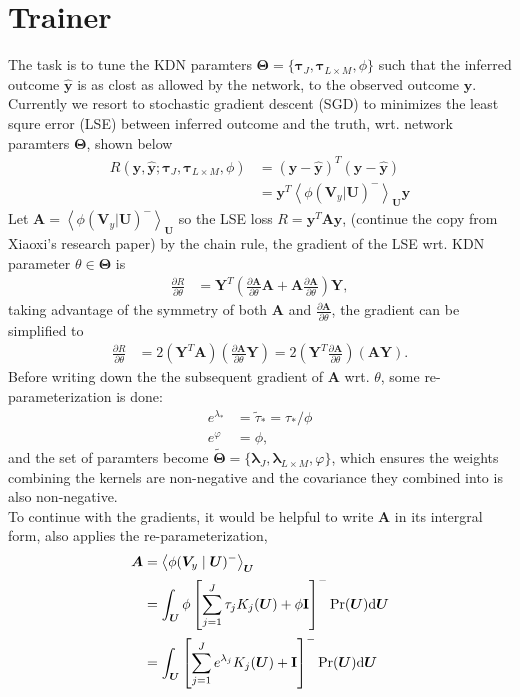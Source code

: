 \documentclass[11pt]{article}
\newcommand{\bs}{\boldsymbol}
\newcommand{\mean}[2]{\left\langle{#1}\right\rangle_{#2}}
\newcommand{\vy}{\boldsymbol{y}}
\newcommand{\xv}{\boldsymbol{V}}
\newcommand{\xu}{\boldsymbol{U}}
\newcommand{\xy}{\boldsymbol{Y}}
\newcommand{\xa}{\boldsymbol{A}}
\newcommand{\vyh}{\hat{\vy}}
\newcommand{\id}{\textrm{\textbf{I}}}
\newcommand{\PDV}[2]{\frac{\partial #1}{\partial #2}}
\begin{document}
\section{Trainer}
The task is to tune the KDN paramters $\bs{\Theta} = \{\bs{\tau}_J, \bs{\tau}_{L \times M}, \phi\}$ such that the inferred outcome $\vyh$ is as clost as allowed by the network, to the observed outcome $\vy$. Currently we resort to stochastic gradient descent (SGD) to minimizes the least squre error (LSE) between inferred outcome and the truth, wrt. network paramters $\bs{\Theta}$, shown below
\begin{equation}
  \begin{split}
    R(\vy, \vyh ; \bs{\tau}_J, \bs{\tau}_{L \times M}, \phi) &= (\vy - \vyh)^T(\vy - \vyh) \\
    &= \vy^T \mean{\phi (\xv_y|\xu)^-}{\xu} \vy
  \end{split}
\end{equation}
Let $\xa = \mean{\phi (\xv_y|\xu)^-}{\xu}$ so the LSE loss $R = \vy^T \xa \vy$, (continue the copy from Xiaoxi's research paper) by the chain rule, the gradient of the LSE wrt. KDN parameter $\theta \in \bs{\Theta}$ is
\begin{align*}
  \PDV{R}{\theta} & = \xy^T \left( \PDV{\xa}{\theta}\xa + \xa\PDV{\xa}{\theta} \right) \xy,
\end{align*}
taking advantage of the symmetry of both $\xa$ and $\PDV{\xa}{\theta}$, the gradient can be simplified to
\begin{align*}
  \PDV{R}{\theta} & = 2 (\xy^T \xa) (\PDV{\xa}{\theta} \xy) = 2 (\xy^T \PDV{\xa}{\theta}) (\xa \xy).
\end{align*}
Before writing down the the subsequent gradient of $\xa$ wrt. $\theta$, some re-parameterization is done:
\begin{align*}
  e^{\lambda_*} &= \tilde{\tau}_* = \tau_* / \phi \\
  e^{\varphi} &= \phi,
\end{align*}
and the set of paramters become $\tilde{\bs{\Theta}} = \{\bs{\lambda}_J, \bs{\lambda}_{L \times M}, \varphi \}$, which ensures the weights combining the kernels are non-negative and the covariance they combined into is also non-negative. \\
To continue with the gradients, it would be helpful to write $\xa$ in its intergral form, also applies the re-parameterization,
\begin{align*}
  \xa &= \mean{\phi (\xv_y\mid\xu)^-}{\xu} \\
      &= \int_{\xu} \phi \left[ \sum_{j=1}^J{\tau_j K_j(\xu)} + \phi\id \right]^- \Pr(\xu) \textrm{d}\xu \\
      &= \int_{\xu} \left[ \sum_{j=1}^J{e^{\lambda_j} K_j(\xu)} + \id \right]^- \Pr(\xu) \textrm{d}\xu
\end{align*}
\end{document}
